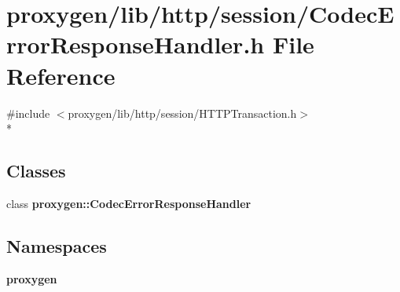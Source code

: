 \section{proxygen/lib/http/session/\+Codec\+Error\+Response\+Handler.h File Reference}
\label{CodecErrorResponseHandler_8h}
{\ttfamily \#include $<$proxygen/lib/http/session/\+H\+T\+T\+P\+Transaction.\+h$>$}\\*
\subsection*{Classes}
\begin{DoxyCompactItemize}
\item 
class {\bf proxygen\+::\+Codec\+Error\+Response\+Handler}
\end{DoxyCompactItemize}
\subsection*{Namespaces}
\begin{DoxyCompactItemize}
\item 
 {\bf proxygen}
\end{DoxyCompactItemize}
